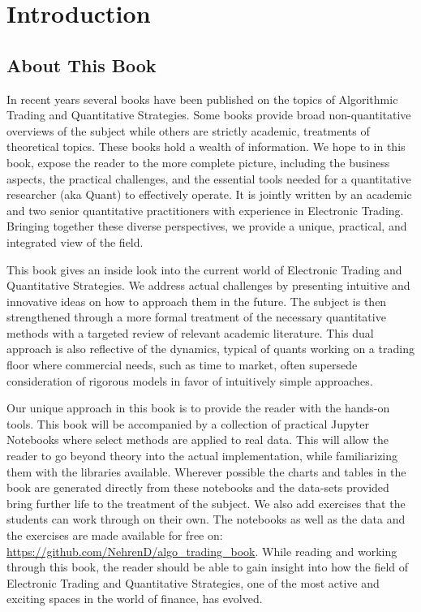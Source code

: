 \chapter{Introduction}\label{chap:ch_intro}
\section{About This Book}

In recent years several books have been published  on the topics of Algorithmic Trading and Quantitative Strategies. Some books provide broad non-quantitative overviews of the subject while others are strictly academic, treatments of theoretical topics. These books hold a wealth of  information. We hope to in this book, expose the reader to the more complete picture, including the business aspects, the practical challenges, and the essential tools needed for a quantitative researcher (aka Quant) to effectively operate. It is jointly written by an academic and two senior quantitative practitioners with experience in Electronic Trading. Bringing together these diverse perspectives, we provide a unique, practical, and integrated view of the field.


This book gives an inside look into the current world of Electronic Trading and Quantitative Strategies. We address actual challenges by presenting intuitive and innovative ideas on how to approach them in the future. The subject is then strengthened through a more formal treatment of the necessary quantitative methods with a targeted review of relevant academic literature. This dual approach is also reflective of the dynamics, typical of quants working on a trading floor where commercial needs, such as time to market, often supersede consideration of rigorous models in favor of intuitively simple approaches. 


Our unique approach in this book is to provide the reader with the hands-on tools. This book will be accompanied by a collection of practical Jupyter Notebooks where select methods are applied to real data. This will allow the reader to go beyond theory into the actual implementation, while familiarizing them with the libraries available. Wherever possible the charts and tables in the book are generated directly from these notebooks and the data-sets provided bring further life to the treatment of the subject. We also add exercises that the students can work through on their own. The notebooks as well as the data and the exercises are made  available for free on: \url{https://github.com/NehrenD/algo_trading_book}. While reading and working through this book, the reader should be able to gain insight into how the field of Electronic Trading and Quantitative Strategies, one of the most active and exciting spaces in the world of finance, has evolved.




